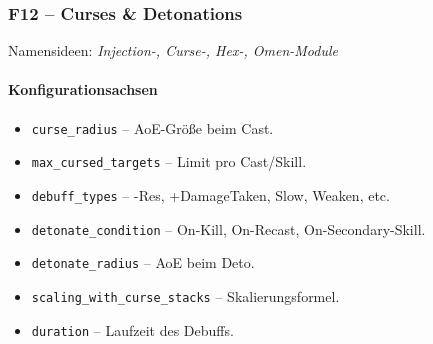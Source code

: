 \subsubsection{F12 – Curses \& Detonations}
Namensideen: \emph{Injection-, Curse-, Hex-, Omen-Module}

\paragraph{Konfigurationsachsen}{}

\begin{itemize}
	\item \texttt{curse\_radius} – AoE-Größe beim Cast.
	\item \texttt{max\_cursed\_targets} – Limit pro Cast/Skill.
	\item \texttt{debuff\_types} – -Res, +DamageTaken, Slow, Weaken, etc.
	\item \texttt{detonate\_condition} – On-Kill, On-Recast, On-Secondary-Skill.
	\item \texttt{detonate\_radius} – AoE beim Deto.
	\item \texttt{scaling\_with\_curse\_stacks} – Skalierungsformel.
	\item \texttt{duration} – Laufzeit des Debuffs.
\end{itemize}


